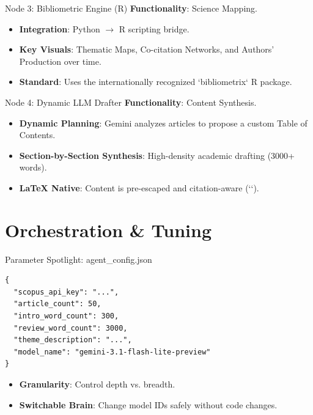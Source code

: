 \documentclass[10pt]{beamer}
\begin{document}
\begin{frame}{Node 3: Bibliometric Engine (R)}
    \textbf{Functionality}: Science Mapping.
    \vfill
    \begin{itemize}
        \item \textbf{Integration}: Python $\to$ R scripting bridge.
        \item \textbf{Key Visuals}: Thematic Maps, Co-citation Networks, and Authors' Production over time.
        \item \textbf{Standard}: Uses the internationally recognized `bibliometrix` R package.
    \end{itemize}
\end{frame}

\begin{frame}{Node 4: Dynamic LLM Drafter}
    \textbf{Functionality}: Content Synthesis.
    \vfill
    \begin{itemize}
        \item \textbf{Dynamic Planning}: Gemini analyzes articles to propose a custom Table of Contents.
        \item \textbf{Section-by-Section Synthesis}: High-density academic drafting (3000+ words).
        \item \textbf{LaTeX Native}: Content is pre-escaped and citation-aware (`\citep{idX}`).
    \end{itemize}
\end{frame}

\section{Orchestration \& Tuning}
\begin{frame}[fragile]{Parameter Spotlight: agent\_config.json}
\begin{lstlisting}[basicstyle=\tiny, frame=single, backgroundcolor=\color{gray!10}]
{
  "scopus_api_key": "...",
  "article_count": 50,
  "intro_word_count": 300,
  "review_word_count": 3000,
  "theme_description": "...",
  "model_name": "gemini-3.1-flash-lite-preview"
}
\end{lstlisting}
    \begin{itemize}
        \item \textbf{Granularity}: Control depth vs. breadth.
        \item \textbf{Switchable Brain}: Change model IDs safely without code changes.
    \end{itemize}
\end{frame}
\end{document}
